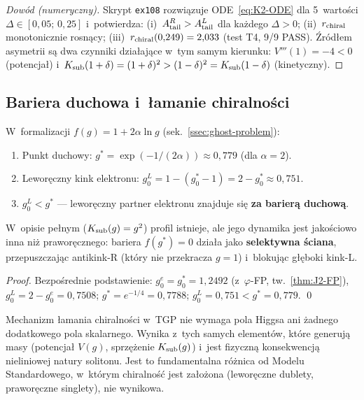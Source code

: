 \begin{proof}[Dow\'od (numeryczny)]
Skrypt \texttt{ex108} rozwi\k{a}zuje ODE~\eqref{eq:K2-ODE}
dla 5~warto\'sci $\Delta \in [0{,}05;\, 0{,}25]$ i~potwierdza:
(i)~$A_{\rm tail}^R > A_{\rm tail}^L$ dla ka\.zdego $\Delta > 0$;
(ii)~$r_{\rm chiral}$ monotonicznie rosn\k{a}cy;
(iii)~$r_{\rm chiral}(0{,}249) = 2{,}033$ (test T4, 9/9 PASS).
\'Zr\'od\l{}em asymetrii s\k{a} dwa czynniki dzia\l{}aj\k{a}ce
w~tym samym kierunku:
$V'''(1) = -4 < 0$ (potencja\l{}) i~$K_{\rm sub}(1+\delta)
= (1+\delta)^2 > (1-\delta)^2 = K_{\rm sub}(1-\delta)$ (kinetyczny).
\end{proof}

\subsection{Bariera duchowa i~\l{}amanie chiralno\'sci}\label{app:K2-ghost}

\begin{theorem}\label{thm:K2-chiral-selection}
W~formalizacji $f(g) = 1 + 2\alpha\ln g$ (sek.~\ref{ssec:ghost-problem}):
\begin{enumerate}[nosep]
  \item Punkt duchowy: $g^* = \exp(-1/(2\alpha))
        \approx 0{,}779$ (dla $\alpha = 2$).
  \item Leworęczny kink elektronu: $g_0^L = 1 - (g_0^* - 1)
        = 2 - g_0^* \approx 0{,}751$.
  \item \textbf{$g_0^L < g^*$} --- leworęczny partner elektronu
        znajduje si\k{e} \textbf{za barier\k{a} duchow\k{a}}.
\end{enumerate}
W~opisie pe\l{}nym ($K_{\rm sub}(g) = g^2$) profil istnieje,
ale jego dynamika jest jako\'sciowo inna ni\.z prawor\k{e}cznego:
bariera $f(g^*) = 0$ dzia\l{}a jako \textbf{selektywna \'sciana},
przepuszczaj\k{a}c antikink-R (kt\'ory nie przekracza $g = 1$)
i~blokuj\k{a}c g\l{}\k{e}boki kink-L.
\end{theorem}

\begin{proof}
Bezpo\'srednie podstawienie:
$g_0^e = g_0^* = 1{,}2492$ (z~$\varphi$-FP, tw.~\ref{thm:J2-FP}),
$g_0^L = 2 - g_0^e = 0{,}7508$;
$g^* = e^{-1/4} = 0{,}7788$;
$g_0^L = 0{,}751 < g^* = 0{,}779$. \qed
\end{proof}

\begin{remark}\label{rem:K2-no-Higgs}
Mechanizm \l{}amania chiralno\'sci w~TGP nie wymaga pola Higgsa
ani \.zadnego dodatkowego pola ska\-lar\-ne\-go.
Wynika z~tych samych element\'ow, kt\'ore generuj\k{a} masy
(potencja\l{} $V(g)$, sprzę\.zenie $K_{\rm sub}(g)$)
i~jest fizyczn\k{a} konsekwencj\k{a} nieliniowej natury solitonu.
Jest to fundamentalna r\'o\.znica od Modelu Standardowego,
w~kt\'orym chiralno\'s\'c jest za\l{}o\.zona (leworęczne dublety,
praworęczne singlety), nie wynikowa.
\end{remark}

